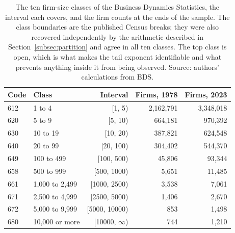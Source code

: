 \begin{table}[H]
\caption{The ten firm-size classes of the Business Dynamics Statistics, the interval
each covers, and the firm counts at the ends of the sample. The class boundaries are
the published Census breaks; they were also recovered independently by the arithmetic
described in Section~\ref{subsec:partition} and agree in all ten classes. The top class
is open, which is what makes the tail exponent identifiable and what prevents anything
inside it from being observed. Source: authors' calculations from BDS.}
\label{tab:bins}
\begin{tabular}{llrrr}
\toprule
Code & Class & Interval & Firms, 1978 & Firms, 2023 \\
\midrule
612 & 1 to 4 & [1, 5) & 2,162,791 & 3,348,018 \\
620 & 5 to 9 & [5, 10) & 664,181 & 970,392 \\
630 & 10 to 19 & [10, 20) & 387,821 & 624,548 \\
640 & 20 to 99 & [20, 100) & 304,402 & 544,370 \\
649 & 100 to 499 & [100, 500) & 45,806 & 93,344 \\
658 & 500 to 999 & [500, 1000) & 5,651 & 11,485 \\
661 & 1,000 to 2,499 & [1000, 2500) & 3,538 & 7,061 \\
671 & 2,500 to 4,999 & [2500, 5000) & 1,406 & 2,670 \\
672 & 5,000 to 9,999 & [5000, 10000) & 853 & 1,498 \\
680 & 10,000 or more & [10000, $\infty$) & 744 & 1,210 \\
\bottomrule
\end{tabular}
\end{table}
